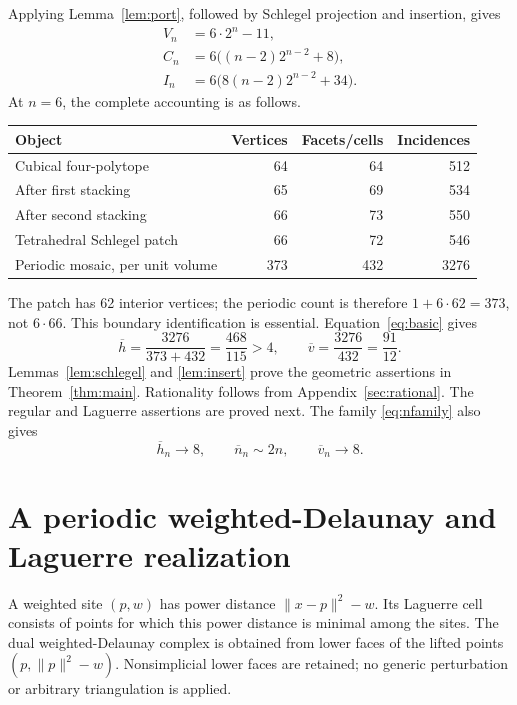 \documentclass[11pt,a4paper]{article}
\theoremstyle{definition}\newtheorem{definition}[theorem]{Definition}
\theoremstyle{remark}\newtheorem{remark}[theorem]{Remark}
\newcommand{\hbarM}{\overline h}\newcommand{\nbar}{\overline n}\newcommand{\vbar}{\overline v}
\begin{document}
Applying Lemma~\ref{lem:port}, followed by Schlegel projection and insertion, gives
\begin{align}\label{eq:nfamily}
 V_n&=6\cdot2^n-11,\nonumber\\
 C_n&=6\bigl((n-2)2^{n-2}+8\bigr),\\
 I_n&=6\bigl(8(n-2)2^{n-2}+34\bigr).\nonumber
\end{align}
At \(n=6\), the complete accounting is as follows.
\begin{center}
\begin{tabular}{lrrr}
\toprule
Object & Vertices & Facets/cells & Incidences\\
\midrule
Cubical four-polytope &64&64&512\\
After first stacking &65&69&534\\
After second stacking &66&73&550\\
Tetrahedral Schlegel patch &66&72&546\\
Periodic mosaic, per unit volume &373&432&3276\\
\bottomrule
\end{tabular}
\end{center}
The patch has 62 interior vertices; the periodic count is therefore \(1+6\cdot62=373\), not \(6\cdot66\). This boundary identification is essential. Equation~\eqref{eq:basic} gives
\[
 \hbarM=\frac{3276}{373+432}=\frac{468}{115}>4,
 \qquad \vbar=\frac{3276}{432}=\frac{91}{12}.
\]
Lemmas~\ref{lem:schlegel} and \ref{lem:insert} prove the geometric assertions in Theorem~\ref{thm:main}. Rationality follows from Appendix~\ref{sec:rational}. The regular and Laguerre assertions are proved next. The family \eqref{eq:nfamily} also gives
\[
 \hbarM_n\longrightarrow8,\qquad \nbar_n\sim2n,\qquad \vbar_n\longrightarrow8.
\]

\section{A periodic weighted-Delaunay and Laguerre realization}\label{sec:regular}
A weighted site \((p,w)\) has power distance \(\|x-p\|^2-w\). Its Laguerre cell consists of points for which this power distance is minimal among the sites. The dual weighted-Delaunay complex is obtained from lower faces of the lifted points \((p,\|p\|^2-w)\). Nonsimplicial lower faces are retained; no generic perturbation or arbitrary triangulation is applied.
\end{document}
